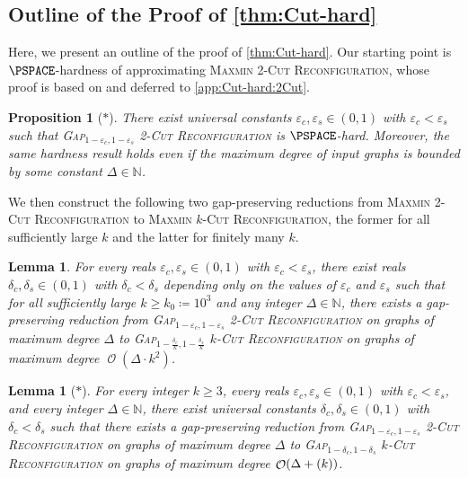 \documentclass[11pt,fleqn]{article}
\renewcommand{\geq}{\geqslant}
\renewcommand{\epsilon}{\varepsilon}
\newcommand{\prb}[1]{\textsc{#1}\xspace}
\newcommand{\defeq}{\coloneq}
\DeclareMathOperator{\bigO}{\mathcal{O}}
\let\poly\relax\DeclareMathOperator*{\poly}{\mathrm{poly}}
\newcommand{\kzero}{10^3}
\newcommand{\kCutReconf}{\prb{$k$-Cut Reconfiguration}}
\newcommand{\MMkCutReconf}{\prb{Maxmin $k$-Cut Reconfiguration}}
\newcommand{\twoCutReconf}{\prb{2-Cut Reconfiguration}}
\newcommand{\MMtwoCutReconf}{\prb{Maxmin 2-Cut Reconfiguration}}
\newcommand{\bbN}{\mathbb{N}}
\newtheorem{proposition}[theorem]{Proposition}
\newtheorem{lemma}[theorem]{Lemma}
\theoremstyle{definition}
\numberwithin{equation}{section}
\begin{document}
\subsection{Outline of the Proof of \texorpdfstring{\cref{thm:Cut-hard}}{Theorem~\protect\ref{thm:Cut-hard}}}
Here, we present an outline of the proof of \cref{thm:Cut-hard}.
Our starting point is $\PSPACE$-hardness of approximating \MMtwoCutReconf,
whose proof is based on \cite{bonsma2009finding,hirahara2024probabilistically,ohsaka2023gap} and
deferred to \cref{app:Cut-hard:2Cut}.


\begin{proposition}[$*$]
\label{prp:Cut-hard:2Cut}
There exist universal constants $\epsilon_c,\epsilon_s \in (0,1)$ with $\epsilon_c < \epsilon_s$ such that
\prb{Gap$_{1-\epsilon_c,1-\epsilon_s}$ \twoCutReconf}
is $\PSPACE$-hard.
Moreover, the same hardness result holds even if
the maximum degree of input graphs is bounded by some constant $\Delta \in \bbN$.
\end{proposition}\noindent
We then construct the following two gap-preserving reductions from \MMtwoCutReconf to \MMkCutReconf,
the former for all sufficiently large $k$ and
the latter for finitely many $k$.


\begin{lemma}
\label{lem:Cut-hard:crazy}
    For every reals $\epsilon_c,\epsilon_s \in (0,1)$ with $\epsilon_c < \epsilon_s$,
    there exist reals $\delta_c, \delta_s \in (0,1)$ with $\delta_c < \delta_s$
    depending only on the values of $\epsilon_c$ and $\epsilon_s$ such that
    for all sufficiently large $k \geq k_0 \defeq \kzero$ and any integer $\Delta \in \bbN$,
    there exists a gap-preserving reduction from
    \prb{Gap$_{1-\epsilon_c,1-\epsilon_s}$ \twoCutReconf}
    on graphs of maximum degree $\Delta$
    to
    \prb{Gap$_{1-\frac{\delta_c}{k},1-\frac{\delta_s}{k}}$ \kCutReconf}
    on graphs of maximum degree $\bigO(\Delta \cdot k^2)$.
\end{lemma}


\begin{lemma}[$*$]
\label{lem:Cut-hard:quadratic}
For every integer $k \geq 3$,
every reals $\epsilon_c,\epsilon_s \in (0,1)$ with $\epsilon_c < \epsilon_s$, and
every integer $\Delta \in \bbN$,
there exist universal constants $\delta_c,\delta_s \in (0,1)$ with $\delta_c<\delta_s$ such that
there exists a gap-preserving reduction from
\prb{Gap$_{1-\epsilon_c, 1-\epsilon_s}$ \twoCutReconf}
on graphs of maximum degree $\Delta$
to
\prb{Gap$_{1-\delta_c, 1-\delta_s}$ \kCutReconf}
on graphs of maximum degree $\bigO(\Delta + \poly(k))$.
\end{lemma}
\end{document}
